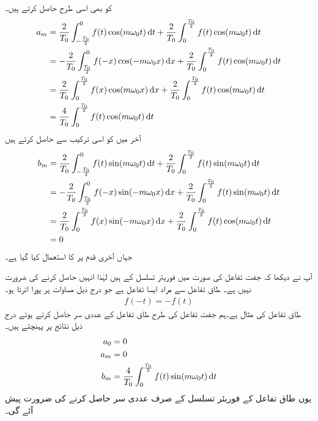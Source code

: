  کو بھی اسی طرح حاصل کرتے ہیں۔
\begin{gather}
\begin{aligned}
a_m&=\frac{2}{T_0}\int_{-\frac{T_0}{2}}^{0}f(t) \cos (m \omega_0 t) \dif t+\frac{2}{T_0}\int_{0}^{\frac{T_0}{2}}f(t) \cos (m \omega_0 t) \dif t\\
&=-\frac{2}{T_0}\int_{\frac{T_0}{2}}^{0}f(-x) \cos (-m \omega_0 x) \dif x+\frac{2}{T_0}\int_{0}^{\frac{T_0}{2}}f(t) \cos (m \omega_0 t) \dif t\\
&=\frac{2}{T_0}\int_0^{\frac{T_0}{2}}f(x) \cos (m \omega_0 x) \dif x+\frac{2}{T_0}\int_{0}^{\frac{T_0}{2}}f(t) \cos (m \omega_0 t) \dif t\\
&=\frac{4}{T_0}\int_{0}^{\frac{T_0}{2}}f(t) \cos (m \omega_0 t) \dif t
\end{aligned}
\end{gather}
آخر میں  کو اسی ترکیب سے حاصل کرتے ہیں
\begin{gather}
\begin{aligned}
b_m&=\frac{2}{T_0}\int_{-\frac{T_0}{2}}^{0}f(t) \sin (m \omega_0 t) \dif t+\frac{2}{T_0}\int_{0}^{\frac{T_0}{2}}f(t) \sin (m \omega_0 t) \dif t\\
&=-\frac{2}{T_0}\int_{\frac{T_0}{2}}^{0}f(-x) \sin(-m \omega_0 x) \dif x+\frac{2}{T_0}\int_{0}^{\frac{T_0}{2}}f(t) \sin (m \omega_0 t) \dif t\\
&=\frac{2}{T_0}\int_0^{\frac{T_0}{2}}f(x) \sin (-m \omega_0 x) \dif x+\frac{2}{T_0}\int_{0}^{\frac{T_0}{2}}f(t) \cos (m \omega_0 t) \dif t\\
&=0
\end{aligned}
\end{gather}
جہاں آخری قدم پر  کا استعمال کیا گیا ہے۔

آپ نے دیکھا کہ جفت تفاعل کی صورت میں فوریئر تسلسل کے  ہیں لہٰذا انہیں حاصل کرنے کی ضرورت نہیں ہے۔
طاق تفاعل سے مراد ایسا تفاعل ہے جو درج ذیل مساوات پر پورا اترتا ہو۔
\begin{align}
f(-t)=-f(t)
\end{align}
طاق تفاعل کی مثال  ہے۔ہم جفت تفاعل کی طرح طاق تفاعل کے عددی سر حاصل کرتے ہوئے درج ذیل نتائج پر پہنچتے ہیں۔
\begin{gather}
\begin{aligned}
a_0&=0\\
a_m&=0\\
b_m&=\frac{4}{T_0}\int_{0}^{\frac{T_0}{2}}f(t) \sin (m \omega_0 t) \dif t
\end{aligned}
\end{gather}
یوں طاق تفاعل کے فوریئر تسلسل کے صرف  عددی سر حاصل کرنے کی ضرورت پیش آئے گی۔

